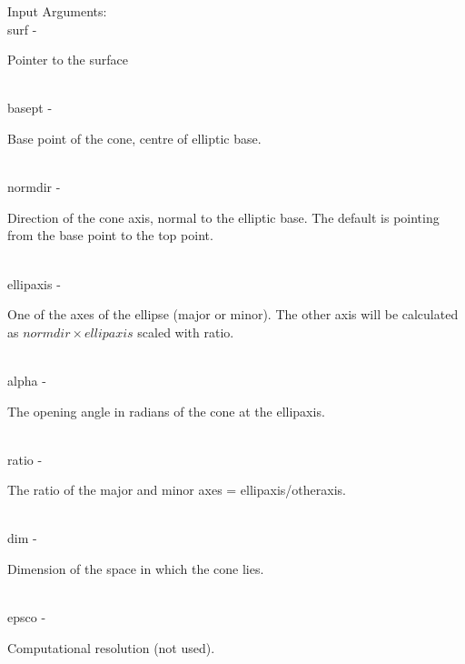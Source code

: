         \>Input Arguments:\\
        \>\>    {\fov surf}\> - \>      \begin{minipg2}
                                Pointer to the surface
                                \end{minipg2}\\
        \>\>    {\fov basept}\> - \>    \begin{minipg2}
                                Base point of the cone, centre of elliptic base.
                                \end{minipg2}\\
        \>\>    {\fov normdir}\> - \>   \begin{minipg2}
                                Direction of the cone axis, normal to the elliptic base. The default is pointing from the base point to the top point.
                                \end{minipg2}\\[0.8ex]
        \>\>    {\fov ellipaxis}\> - \> \begin{minipg2}
                                One of the axes of the ellipse (major or
                                minor).
                                The other axis will be calculated as
                                $normdir\times ellipaxis$ scaled with
                                {\fov ratio}.
                                \end{minipg2}\\[0.8ex]
        \>\>    {\fov alpha}\> - \>     \begin{minipg2}
                                The opening angle in radians of the cone at the ellipaxis.
                                \end{minipg2}\\[0.8ex]
        \>\>    {\fov ratio}\> - \>     \begin{minipg2}
                                The ratio of the major and minor
                                axes = ellipaxis/otheraxis.
                                \end{minipg2}\\[0.8ex]
        \>\>    {\fov dim}\> - \>       \begin{minipg2}
                                Dimension of the space in which the cone lies.
                                \end{minipg2}\\
        \>\>    {\fov epsco}\> - \>     \begin{minipg2}
                                Computational resolution (not used).
                                \end{minipg2}\\
